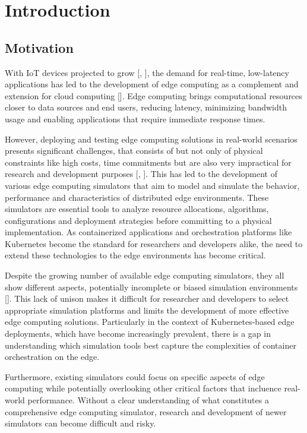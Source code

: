 \chapter{Introduction}
\section{Motivation}
  With IoT devices projected to grow [\cite{7488250}, \cite{10258346}], the demand for real-time, low-latency applications has led to the development of edge computing as a complement and extension for cloud computing [\cite{ASHOURI2021100346}].
  Edge computing brings computational resources closer to data sources and end users, reducing latency, minimizing bandwidth usage and enabling applications that require immediate response times.

  However, deploying and testing edge computing solutions in real-world scenarios presents significant challenges, that consists of but not only of physical constraints like high costs, time commitments but are also very impractical for research and development purposes [\cite{ASHOURI2021100346}, \cite{7488250}].
  This has led to the development of various edge computing simulators that aim to model and simulate the behavior, performance and characteristics of distributed edge environments.
  These simulators are essential tools to analyze resource allocations, algorithms, configurations and deployment strategies before committing to a physical implementation.
  As containerized applications and orchestration platforms like Kubernetes become the standard for researchers and developers alike, the need to extend these technologies to the edge environments has become critical.


  Despite the growing number of available edge computing simulators, they all show different aspects, potentially incomplete or biased simulation environments [\cite{ASHOURI2021100346}].
  This lack of unison makes it difficult for researcher and developers to select appropriate simulation platforms and limits the development of more effective edge computing solutions.
  Particularly in the context of Kubernetes-based edge deployments, which have become increasingly prevalent, there is a gap in understanding which simulation tools best capture the complexities of container orchestration on the edge.


  Furthermore, existing simulators could focus on specific aspects of edge computing while potentially overlooking other critical factors that incluence real-world performance.
  Without a clear understanding of what constitutes a comprehensive edge computing simulator, research and development of newer simulators can become difficult and risky.

